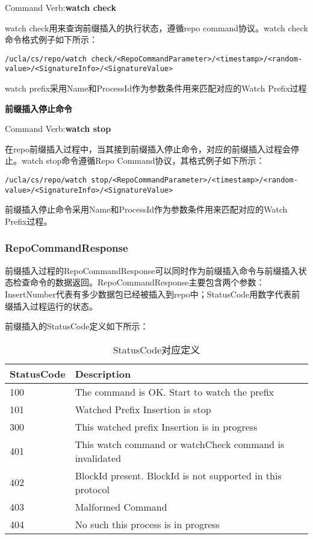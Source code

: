 Command Verb:\textbf{watch check}

watch check用来查询前缀插入的执行状态，遵循repo command协议。watch check命令格式例子如下所示：

\begin{framed}
\begin{scriptsize}
\begin{verbatim}
/ucla/cs/repo/watch check/<RepoCommandParameter>/<timestamp>/<random-value>/<SignatureInfo>/<SignatureValue>
\end{verbatim}
\end{scriptsize}
\end{framed}

watch prefix采用Name和ProcessId作为参数条件用来匹配对应的Watch Prefix过程

\textbf{前缀插入停止命令}

Command Verb:\textbf{watch stop}

在repo前缀插入过程中，当其接到前缀插入停止命令，对应的前缀插入过程会停止。watch stop命令遵循Repo Command协议，其格式例子如下所示：

\begin{framed}
\begin{scriptsize}
\begin{verbatim}
/ucla/cs/repo/watch stop/<RepoCommandParameter>/<timestamp>/<random-value>/<SignatureInfo>/<SignatureValue>
\end{verbatim}
\end{scriptsize}
\end{framed}

前缀插入停止命令采用Name和ProcessId作为参数条件用来匹配对应的Watch Prefix过程。

\subsubsection{RepoCommandResponse}
前缀插入过程的RepoCommandResponse可以同时作为前缀插入命令与前缀插入状态检查命令的数据返回。RepoCommandResponse主要包含两个参数：InsertNumber代表有多少数据包已经被插入到repo中；StatusCode用数字代表前缀插入过程运行的状态。

前缀插入的StatusCode定义如下所示：

\begin{table}[h]
\centering
\caption{StatusCode对应定义}
\label{tab:watch-statusCode}
\begin{tabular}{|l|l|}
\hline
\textbf{StatusCode} & \textbf{Description} \\ \hline
100 & The command is OK. Start to watch the prefix \\ \hline
101 & Watched Prefix Insertion is stop \\ \hline
300 & This watched prefix Insertion is in progress \\ \hline
401 & This watch command or watchCheck command is invalidated \\ \hline
402 & BlockId present. BlockId is not supported in this protocol \\ \hline
403 & Malformed Command \\ \hline
404 & No such this process is in progress \\ \hline
\end{tabular}
\end{table}

